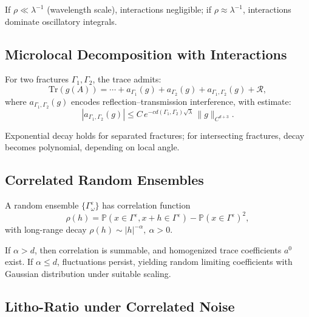 \begin{remark}
If $\rho \ll \lambda^{-1}$ (wavelength scale), interactions negligible; if $\rho \approx \lambda^{-1}$, interactions dominate oscillatory integrals.  
\end{remark}

\subsection{Microlocal Decomposition with Interactions}

\begin{proposition}
For two fractures $\Gamma_1,\Gamma_2$, the trace admits:
\[
\mathrm{Tr}(g(A)) = \cdots + a_{\Gamma_1}(g) + a_{\Gamma_2}(g) + a_{\Gamma_1,\Gamma_2}(g) + \mathcal{R},
\]
where $a_{\Gamma_1,\Gamma_2}(g)$ encodes reflection–transmission interference, with estimate:
\[
|a_{\Gamma_1,\Gamma_2}(g)| \leq C \, e^{-c d(\Gamma_1,\Gamma_2)\sqrt{\lambda}} \, \|g\|_{C^{d+3}}.
\]
\end{proposition}

\begin{remark}
Exponential decay holds for separated fractures; for intersecting fractures, decay becomes polynomial, depending on local angle.  
\end{remark}

\subsection{Correlated Random Ensembles}

\begin{definition}
A random ensemble $\{\Gamma^\varepsilon_\omega\}$ has correlation function 
\[
\rho(h) = \mathbb{P}(x\in \Gamma^\varepsilon, x+h \in \Gamma^\varepsilon) - \mathbb{P}(x\in \Gamma^\varepsilon)^2,
\]
with long-range decay $\rho(h)\sim |h|^{-\alpha}, \ \alpha>0$.  
\end{definition}

\begin{theorem}
If $\alpha>d$, then correlation is summable, and homogenized trace coefficients $a^0$ exist.  
If $\alpha \leq d$, fluctuations persist, yielding random limiting coefficients with Gaussian distribution under suitable scaling.  
\end{theorem}

\subsection{Litho-Ratio under Correlated Noise}

